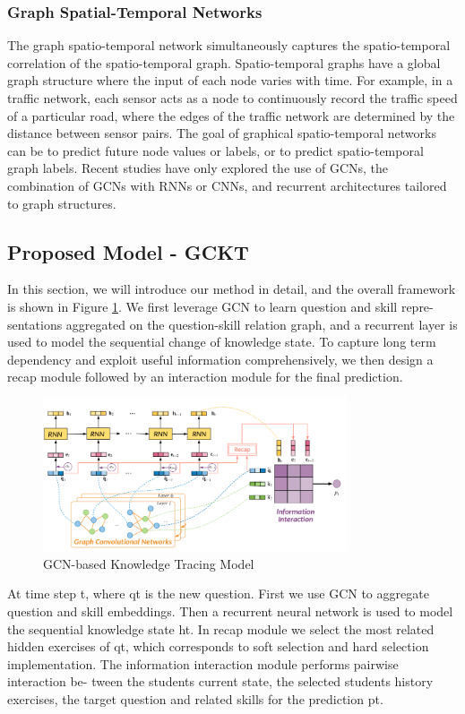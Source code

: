 \documentclass[11pt,en]{elegantpaper}
\begin{document}
\subsubsection{Graph Spatial-Temporal Networks}
The graph spatio-temporal network simultaneously captures the spatio-temporal correlation of the spatio-temporal graph. Spatio-temporal graphs have a global graph structure where the input of each node varies with time. For example, in a traffic network, each sensor acts as a node to continuously record the traffic speed of a particular road, where the edges of the traffic network are determined by the distance between sensor pairs. The goal of graphical spatio-temporal networks can be to predict future node values or labels, or to predict spatio-temporal graph labels. Recent studies have only explored the use of GCNs, the combination of GCNs with RNNs or CNNs, and recurrent architectures tailored to graph structures.

\subsection{Proposed Model - GCKT}
In this section, we will introduce our method in detail, and the overall framework is shown in Figure \ref{GCKT1}. We first leverage GCN to learn question and skill repre- sentations aggregated on the question-skill relation graph, and a recurrent layer is used to model the sequential change of knowledge state. To capture long term dependency and exploit useful information comprehensively, we then design a recap module followed by an interaction module for the final prediction.

\begin{figure}[h]
	\centering
	\includegraphics[width=0.8\textwidth]{./image/GCKT1.png}
	\caption{GCN-based Knowledge Tracing Model}
	\label{GCKT1}
\end{figure}

At time step t, where qt is the new question. First we use GCN to aggregate question and skill embeddings. Then a recurrent neural network is used to model the sequential knowledge state ht. In recap module we select the most related hidden exercises of qt, which corresponds to soft selection and hard selection implementation. The information interaction module performs pairwise interaction be- tween the students current state, the selected students history exercises, the target question and related skills for the prediction pt.
\end{document}
